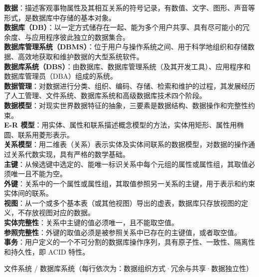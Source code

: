 \documentclass[a4paper,11pt]{article}
\begin{document}
\begin{keyterms}
\textbf{数据}：描述客观事物属性及其相互关系的符号记录，有数值、文字、图形、声音等形式，是数据库中存储的基本对象。\\
\textbf{数据库（DB）}：以一定方式储存在一起、能为多个用户共享、具有尽可能小的冗余度、与应用程序彼此独立的数据集合。\\
\textbf{数据库管理系统（DBMS）}：位于用户与操作系统之间、用于科学地组织和存储数据、高效地获取和维护数据的大型系统软件。\\
\textbf{数据库系统（DBS）}：由数据库、数据库管理系统（及其开发工具）、应用程序和数据库管理员（DBA）组成的系统。\\
\textbf{数据管理}：对数据进行分类、组织、编码、存储、检索和维护的过程，其发展经历了人工管理、文件系统、数据库系统和高级数据库技术四个阶段。\\
\textbf{数据模型}：对现实世界数据特征的抽象，三要素是数据结构、数据操作和完整性约束。\\
\textbf{E-R 模型}：用实体、属性和联系描述概念模型的方法，实体用矩形、属性用椭圆、联系用菱形表示。\\
\textbf{关系模型}：用二维表（关系）表示实体及实体间联系的数据模型，对数据的操作通过关系代数实现，具有严格的数学基础。\\
\textbf{主键}：从候选键中选定的、能唯一标识关系中每个元组的属性或属性组，其取值必须唯一且不能为空。\\
\textbf{外键}：关系中的一个属性或属性组，其取值参照另一关系的主键，用于表示和约束实体间的联系。\\
\textbf{视图}：从一个或多个基本表（或其他视图）导出的虚表，数据库只存放视图的定义，不存放视图对应的数据。\\
\textbf{实体完整性}：关系中主键的值必须唯一，且不能取空值。\\
\textbf{参照完整性}：外键的取值必须是被参照关系中已存在的主键值，或者取空值。\\
\textbf{事务}：用户定义的一个不可分割的数据库操作序列，具有原子性、一致性、隔离性和持久性，即 ACID 特性。
\end{keyterms}

\begin{contrast}{文件系统 / 数据库系统（每行依次为：数据组织方式·冗余与共享·数据独立性）}
\end{contrast}
\end{document}
